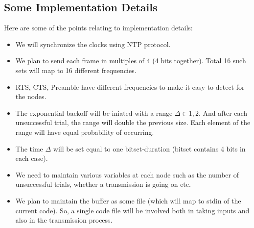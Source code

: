 \documentclass[a4paper,12pt]{article}
\begin{document}
\subsection{Some Implementation Details}
Here are some of the points relating to implementation details:
\begin{itemize}
    \item We will synchronize the clocks using NTP protocol.
    \item We plan to send each frame in multiples of 4 (4 bits together). Total 16 such sets will map to 16 different frequencies.
    \item RTS, CTS, Preamble have different frequencies to make it easy to detect for the nodes.
    \item The exponential backoff will be iniated with a range $\Delta \in {1, 2}$. And after each unsuccessful trial, the range will double the previous size. Each element of the range will have equal probability of occurring.
    \item The time $\Delta$ will be set equal to one bitset-duration (bitset contains 4 bits in each case).
    \item We need to maintain various variables at each node such as the number of unsuccessful trials, whether a transmission is going on etc.
    \item We plan to maintain the buffer as some file (which will map to stdin of the current code). So, a single code file will be involved both in taking inputs and also in the transmission process.
\end{itemize}
\end{document}

